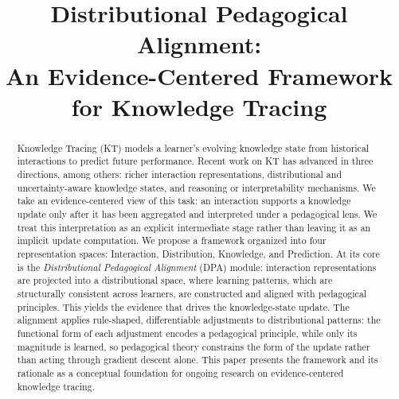 \documentclass[conference]{IEEEtran}
\begin{document}
\title{Distributional Pedagogical Alignment:\\An Evidence-Centered Framework for Knowledge Tracing}

\author{%
\and
{}
}

\maketitle

\begin{abstract}
Knowledge Tracing (KT) models a learner's evolving knowledge state from historical interactions to predict future performance. Recent work on KT has advanced in three directions, among others: richer interaction representations, distributional and uncertainty-aware knowledge states, and reasoning or interpretability mechanisms. We take an evidence-centered view of this task: an interaction supports a knowledge update only after it has been aggregated and interpreted under a pedagogical lens. We treat this interpretation as an explicit intermediate stage rather than leaving it as an implicit update computation. We propose a framework organized into four representation spaces: Interaction, Distribution, Knowledge, and Prediction. At its core is the \emph{Distributional Pedagogical Alignment} (DPA) module: interaction representations are projected into a distributional space, where learning patterns, which are structurally consistent across learners, are constructed and aligned with pedagogical principles. This yields the evidence that drives the knowledge-state update. The alignment applies rule-shaped, differentiable adjustments to distributional patterns: the functional form of each adjustment encodes a pedagogical principle, while only its magnitude is learned, so pedagogical theory constrains the form of the update rather than acting through gradient descent alone. This paper presents the framework and its rationale as a conceptual foundation for ongoing research on evidence-centered knowledge tracing.
\end{abstract}
\end{document}
